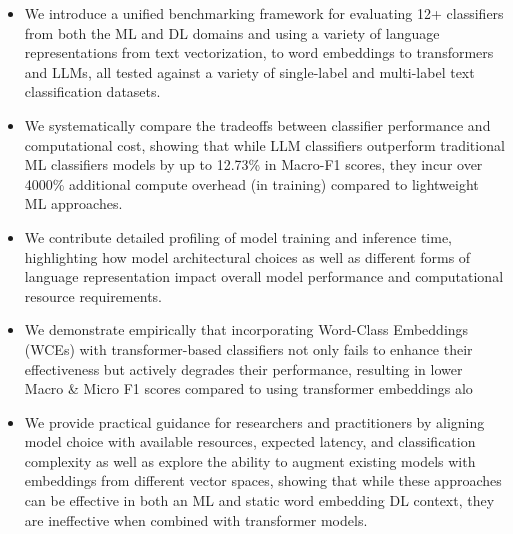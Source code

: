 \documentclass[final]{clv2025}
\begin{document}
\begin{itemize}

\item We introduce a unified benchmarking framework for evaluating 12+ classifiers from both the ML and DL domains and using a variety of language representations from text vectorization, to word embeddings to transformers and LLMs, all tested against a variety of single-label and multi-label text classification datasets.
\item We systematically compare the tradeoffs between classifier performance and computational cost, showing that while LLM classifiers outperform traditional ML classifiers models by up to 12.73\% in Macro-F1 scores, they incur over 4000\% additional compute overhead (in training) compared to lightweight ML approaches.
\item We contribute detailed profiling of model training and inference time, highlighting how model architectural choices as well as different forms of language representation impact overall model performance and computational resource requirements.
\item We demonstrate empirically that incorporating Word-Class Embeddings (WCEs) with transformer-based classifiers not only fails to enhance their effectiveness but actively degrades their performance, resulting in lower Macro \& Micro F1 scores compared to using transformer embeddings alo
\item We provide practical guidance for researchers and practitioners by aligning model choice with available resources, expected latency, and classification complexity as well as explore the ability to augment existing models with embeddings from different vector spaces, showing that while these approaches can be effective in both an ML and static word embedding DL context, they are ineffective when combined with transformer models.
\end{itemize}
\end{document}
